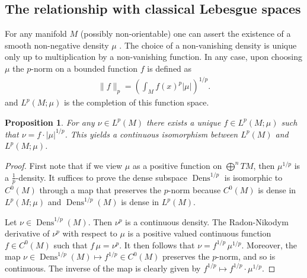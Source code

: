 \documentclass[12pt]{amsart}
\newtheorem{prop}[thm]{Proposition}
\DeclareMathOperator{\Dens}{Dens}
\begin{document}
\subsection{The relationship with classical Lebesgue spaces}
\label{sec:classical_Lebesgue}
For any manifold $M$ (possibly non-orientable) one can assert the existence of a smooth non-negative density $\mu$ .
The choice of a non-vanishing density is unique only up to multiplication by a non-vanishing function.
In any case, upon choosing $\mu$ the $p$-norm on a bounded function $f$ is defined as
\begin{align*}
	\| f \|_p =  \left( \int_M f(x)^p |\mu| \right)^{1/p}.
\end{align*}
and $L^p(M ; \mu)$ is the completion of this function space.

\begin{prop}
	For any $\nu \in L^p(M)$ there exists a unique $f \in L^p(M ; \mu)$ such that $\nu = f \cdot |\mu|^{1/p}$.
	This yields a continuous isomorphism between $L^p(M)$ and $L^p(M ; \mu)$.
\end{prop}
\begin{proof}
	First note that if we view $\mu$ as a positive function on $\bigoplus^n TM$, then $\mu^{1/p}$ is a $\frac{1}{p}$-density.
	It suffices to prove the dense subspace $\Dens^{1/p}$ is isomorphic to $C^0(M)$ through a map that preserves the $p$-norm
	because $C^0(M)$ is dense in $L^p(M ; \mu)$ and $\Dens^{1/p}(M)$ is dense in $L^p(M)$.
	
	Let $\nu \in \Dens^{1/p}(M)$.  Then $\nu^p$ is a continuous density.
	The Radon-Nikodym derivative of $\nu^p$ with respect to $\mu$ is a positive valued continuous function $f \in C^0(M)$ such that $f \, \mu = \nu^p$.
	It then follows that $\nu = f^{1/p} \, \mu^{1/p}$.
	Moreover, the map $\nu \in \Dens^{1/p}(M) \mapsto f^{1/p} \in C^0(M)$ preserves the $p$-norm, and so is continuous.
	The inverse of the map is clearly given by $f^{1/p} \mapsto f^{1/p} \cdot \mu^{1/p}$.
\end{proof}
\end{document}
